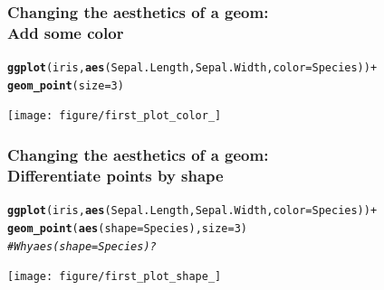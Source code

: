 \documentclass{beamer}\usepackage[]{graphicx}\usepackage[]{color}
\makeatletter
\newcommand{\hlcom}[1]{\textcolor[rgb]{0.678,0.584,0.686}{\textit{#1}}}%
\newcommand{\hlkwd}[1]{\textcolor[rgb]{0.737,0.353,0.396}{\textbf{#1}}}%
\newenvironment{kframe}{%
 \def\at@end@of@kframe{}%
 \ifinner\ifhmode%
  \def\at@end@of@kframe{\end{minipage}}%
  \begin{minipage}{\columnwidth}%
 \fi\fi%
 \def\FrameCommand##1{\hskip\@totalleftmargin \hskip-\fboxsep
 \colorbox{shadecolor}{##1}\hskip-\fboxsep
     \hskip-\linewidth \hskip-\@totalleftmargin \hskip\columnwidth}%
 \MakeFramed {\advance\hsize-\width
   \@totalleftmargin\z@ \linewidth\hsize
   \@setminipage}}%
 {\par\unskip\endMakeFramed%
 \at@end@of@kframe}
\newenvironment{knitrout}{}{} %
\makeatother
\begin{document}

\begin{frame}[fragile]
\frametitle{Changing the aesthetics of a geom: \\Add some color}
\begin{knitrout}\footnotesize
{}\color{fgcolor}\begin{kframe}
\begin{alltt}
\hlkwd{ggplot}(iris, \hlkwd{aes}(Sepal.Length, Sepal.Width, color = Species)) +
\hlkwd{geom_point}(size = 3)
\end{alltt}
\end{kframe}

{\centering \texttt{[image: figure/first\_plot\_color\_]} 

}



\end{knitrout}

\end{frame}


\begin{frame}[fragile]
\frametitle{Changing the aesthetics of a geom: \\Differentiate points by shape}
\begin{knitrout}\footnotesize
{}\color{fgcolor}\begin{kframe}
\begin{alltt}
\hlkwd{ggplot}(iris, \hlkwd{aes}(Sepal.Length, Sepal.Width, color = Species)) +
\hlkwd{geom_point}(\hlkwd{aes}(shape = Species), size = 3)
\hlcom{# Why aes(shape = Species)?}
\end{alltt}
\end{kframe}

{\centering \texttt{[image: figure/first\_plot\_shape\_]} 

}



\end{knitrout}

\end{frame}

\end{document}
